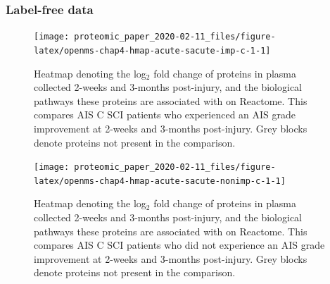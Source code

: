 \documentclass[9pt,lineno]{elife}
\begin{document}
\hypertarget{label-free-data}{%
\subsubsection{Label-free data}\label{label-free-data}}

\clearpage
\begin{landscape}



\begin{figure}

{\centering \texttt{[image: proteomic\_paper\_2020-02-11\_files/figure-latex/openms-chap4-hmap-acute-sacute-imp-c-1-1]} 

}

\caption[Heatmap - label-free - Acute C Improvers VS Subacute Improvers]{Heatmap denoting the log\(_2\) fold change of proteins in plasma collected 2-weeks and 3-months post-injury, and the biological pathways these proteins are associated with on Reactome. This compares AIS C SCI patients who experienced an AIS grade improvement at 2-weeks and 3-months post-injury. Grey blocks denote proteins not present in the comparison.}\label{fig:openms-chap4-hmap-acute-sacute-imp-c-1}
\end{figure}

\end{landscape}
\begin{landscape}



\begin{figure}

{\centering \texttt{[image: proteomic\_paper\_2020-02-11\_files/figure-latex/openms-chap4-hmap-acute-sacute-nonimp-c-1-1]} 

}

\caption[Heatmap - label-free - Acute C Non-Improvers VS Subacute Non-Improvers]{Heatmap denoting the log\(_2\) fold change of proteins in plasma collected 2-weeks and 3-months post-injury, and the biological pathways these proteins are associated with on Reactome. This compares AIS C SCI patients who did not experience an AIS grade improvement at 2-weeks and 3-months post-injury. Grey blocks denote proteins not present in the comparison.}\label{fig:openms-chap4-hmap-acute-sacute-nonimp-c-1}
\end{figure}

\end{landscape}
\end{document}
